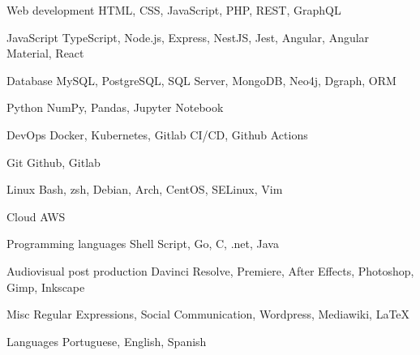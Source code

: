 

\begin{cvskills}

  \cvskill
    {Web development} %
    {HTML, CSS, JavaScript, PHP, REST, GraphQL} %

  \cvskill
    {JavaScript} %
    {TypeScript, Node.js, Express, NestJS, Jest, Angular, Angular Material, React} %

  \cvskill
    {Database} %
    {MySQL, PostgreSQL, SQL Server, MongoDB, Neo4j, Dgraph, ORM} %

  \cvskill
    {Python} %
    {NumPy, Pandas, Jupyter Notebook} %

  \cvskill
    {DevOps} %
    {Docker, Kubernetes, Gitlab CI/CD, Github Actions} %

  \cvskill
    {Git} %
    {Github, Gitlab} %

  \cvskill
    {Linux} %
    {Bash, zsh, Debian, Arch, CentOS, SELinux, Vim} %

  \cvskill
    {Cloud} %
    {AWS} %

  \cvskill
    {Programming languages} %
    {Shell Script, Go, C, .net, Java} %

  \cvskill
    {Audiovisual post production} %
    {Davinci Resolve, Premiere, After Effects, Photoshop, Gimp, Inkscape} %

  \cvskill
    {Misc} %
    {Regular Expressions, Social Communication, Wordpress, Mediawiki, \LaTeX} %

  \cvskill
    {Languages} %
    {Portuguese, English, Spanish} %

\end{cvskills}

